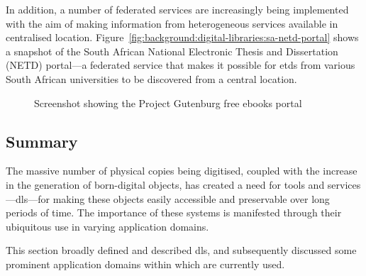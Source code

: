In addition, a number of federated services are increasingly being implemented
with the aim of making information from heterogeneous services available in
centralised location. Figure~\ref{fig:background:digital-libraries:sa-netd-portal} shows a snapshot of the
South African National Electronic Thesis and Dissertation (NETD) portal---a federated
service that makes it possible for \glspl{etd} from various South African universities
to be discovered from a central location.

\begin{figure}
 \centering
  \caption{Screenshot showing the Project Gutenburg free ebooks portal}
  \label{fig:background:digital-libraries:project-gutenburg}
\end{figure}

\subsection{Summary}
\label{sec:background:digital-libraries:summary}

The massive number of physical copies being digitised, coupled with the increase in the generation of born-digital objects, has created a need for tools and services---\glspl{dl}---for making these objects easily accessible and preservable over long periods of time. The importance of these systems is manifested through their ubiquitous use in varying application domains.

This section broadly defined and described \glspl{dl}, and subsequently discussed some prominent application domains within which are currently used.